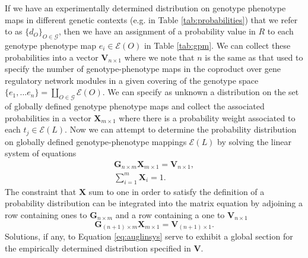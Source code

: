 If we have an experimentally determined distribution on genotype phenotype maps in different genetic contexts (e.g. in Table \ref{tab:probabilities}) that we refer to as $\{d_O\}_{O \in \mathcal{G}}$, then we have an assignment of a probability value in $R$ to each genotype phenotype map $e_i \in \mathcal{E}(O)$ in Table \ref{tab:gpm}. We can collect these probabilities into a vector $\mathbf{V}_{n \times 1}$ where we note that $n$ is the same as that used to specify the number of genotype-phenotype maps in the coproduct over gene regulatory network modules in a given covering of the genotype space $\{e_1, \ldots e_n\} = \coprod_{O \in \mathcal{G}} \mathcal{E}(O)$. We can specify as unknown a distribution on the set of globally defined genotype phenotype maps and collect the associated probabilities in a vector $\mathbf{X}_{m \times 1}$ where there is a probability weight associated to each $t_j \in \mathcal{E}(L)$. Now we can attempt to determine the probability distribution on globally defined genotype-phenotype mappings $\mathcal{E}(L)$ by solving the linear system of equations
\begin{equation}
\begin{split}
\mathbf{G}_{n \times m} \mathbf{X}_{m \times 1} = \mathbf{V}_{n \times 1},\\
\sum_{i=1}^{m} \mathbf{X}_{i} = 1.
\end{split}
\end{equation}
The constraint that $\mathbf{X}$ sum to one in order to satisfy the definition of a probability distribution can be integrated into the matrix equation by adjoining a row containing ones to $\mathbf{G}_{n \times m}$ and a row containing a one to $\mathbf{V}_{n \times 1}$
\begin{equation}\label{eq:auglinsys}
\mathbf{G}_{(n + 1) \times m} \mathbf{X}_{m \times 1} = \mathbf{V}_{(n + 1) \times 1}.
\end{equation}
Solutions, if any, to Equation \ref{eq:auglinsys} serve to exhibit a global section for the empirically determined distribution specified in $\mathbf{V}$.

